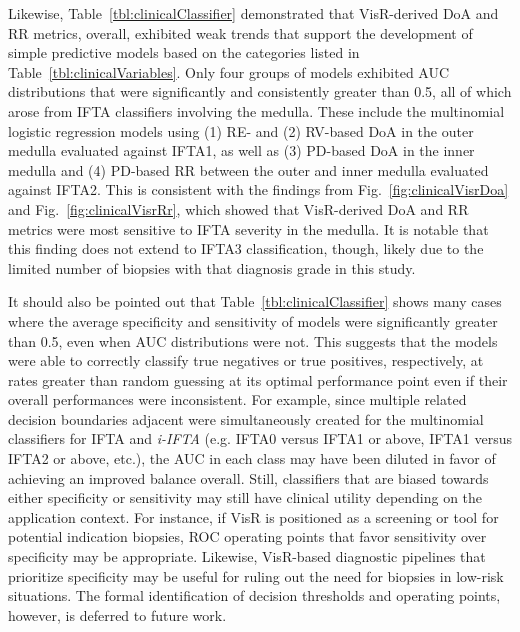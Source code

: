 Likewise, Table~\ref{tbl:clinicalClassifier} demonstrated that VisR-derived DoA and RR metrics, overall, exhibited weak trends that support the development of simple predictive models based on the categories listed in Table~\ref{tbl:clinicalVariables}. Only four groups of models exhibited AUC distributions that were significantly and consistently greater than 0.5, all of which arose from IFTA classifiers involving the medulla. These include the multinomial logistic regression models using (1) RE- and (2) RV-based DoA in the outer medulla evaluated against IFTA1, as well as (3) PD-based DoA in the inner medulla and (4) PD-based RR between the outer and inner medulla evaluated against IFTA2. This is consistent with the findings from Fig.~\ref{fig:clinicalVisrDoa} and Fig.~\ref{fig:clinicalVisrRr}, which showed that VisR-derived DoA and RR metrics were most sensitive to IFTA severity in the medulla. It is notable that this finding does not extend to IFTA3 classification, though, likely due to the limited number of biopsies with that diagnosis grade in this study.

It should also be pointed out that Table~\ref{tbl:clinicalClassifier} shows many cases where the average specificity and sensitivity of models were significantly greater than 0.5, even when AUC distributions were not. This suggests that the models were able to correctly classify true negatives or true positives, respectively, at rates greater than random guessing at its optimal performance point even if their overall performances were inconsistent. For example, since multiple related decision boundaries adjacent were simultaneously created for the multinomial classifiers for IFTA and \emph{i-IFTA} (e.g. IFTA0 versus IFTA1 or above, IFTA1 versus IFTA2 or above, etc.), the AUC in each class may have been diluted in favor of achieving an improved balance overall. Still, classifiers that are biased towards either specificity or sensitivity may still have clinical utility depending on the application context. For instance, if VisR is positioned as a screening or tool for potential indication biopsies, ROC operating points that favor sensitivity over specificity may be appropriate. Likewise, VisR-based diagnostic pipelines that prioritize specificity may be useful for ruling out the need for biopsies in low-risk situations. The formal identification of decision thresholds and operating points, however, is deferred to future work.

%

